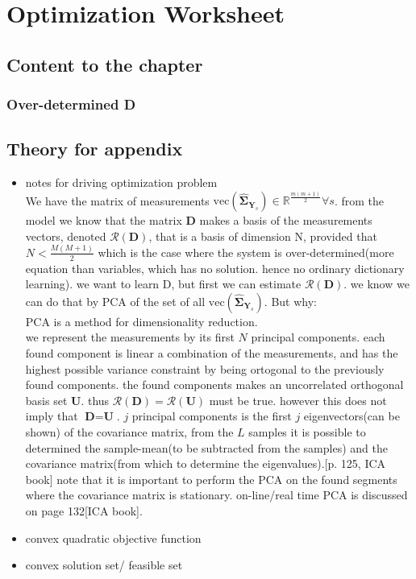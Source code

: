 \chapter*{Optimization Worksheet}
\section{Content to the chapter}
\subsection{Over-determined \textbf{D}}


\section{Theory for appendix}
\begin{itemize}
\item notes for driving optimization problem\\
We have the matrix of measurements $\text{vec}(\widehat{\boldsymbol{\Sigma}}_{\textbf{Y}_s})\in \mathbb{R}^{\frac{m(m+1)}{2}} \forall s$. from the model we know that the matrix $\textbf{D}$ makes a basis of the measurements vectors, denoted $\mathcal{R}(\textbf{D})$, that is a basis of dimension N, provided that $N < \frac{M(M+1)}{2}$ which is the case where the system is over-determined(more equation than variables, which has no solution. hence no ordinary dictionary learning). 
we want to learn D, but first we can estimate $\mathcal{R}(\textbf{D})$. 
we know we can do that by PCA of the set of all $\text{vec}(\widehat{\boldsymbol{\Sigma}}_{\textbf{Y}_s})$. 
But why:\\
PCA is a method for dimensionality reduction. \\
we represent the measurements by its first $N$ principal components. 
each found component is linear a combination of the measurements, and has the highest possible variance constraint by being ortogonal to the previously found components. the found components makes an uncorrelated orthogonal basis set $\textbf{U}$. 
thus  $\mathcal{R}(\textbf{D}) = \mathcal{R}(\textbf{U})$ must be true. however this does not imply that $\textbf{D}=\textbf{U}$. 
$j$ principal components is the first $j$ eigenvectors(can be shown) of the covariance matrix, from the $L$ samples it is possible to determined the sample-mean(to be subtracted from the samples) and the covariance matrix(from which to determine the eigenvalues).[p. 125, ICA book]
note that it is important to perform the PCA on the found segments where the covariance matrix is stationary. on-line/real time PCA is discussed on page 132[ICA book].	       


\item convex quadratic objective function
\item convex solution set/ feasible set 

\end{itemize}
